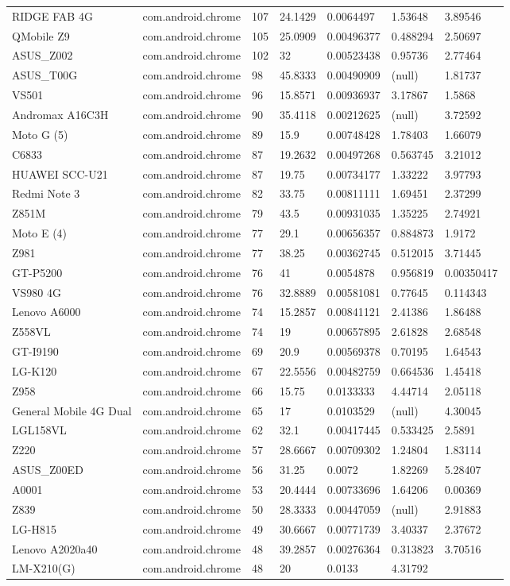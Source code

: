 \documentclass[
]{article}
\begin{document}
\begin{longtable}[]{@{}lllllll@{}}
RIDGE FAB 4G & com.android.chrome & 107 & 24.1429 & 0.0064497 & 1.53648
& 3.89546\tabularnewline
QMobile Z9 & com.android.chrome & 105 & 25.0909 & 0.00496377 & 0.488294
& 2.50697\tabularnewline
ASUS\_Z002 & com.android.chrome & 102 & 32 & 0.00523438 & 0.95736 &
2.77464\tabularnewline
ASUS\_T00G & com.android.chrome & 98 & 45.8333 & 0.00490909 & (null) &
1.81737\tabularnewline
VS501 & com.android.chrome & 96 & 15.8571 & 0.00936937 & 3.17867 &
1.5868\tabularnewline
Andromax A16C3H & com.android.chrome & 90 & 35.4118 & 0.00212625 &
(null) & 3.72592\tabularnewline
Moto G (5) & com.android.chrome & 89 & 15.9 & 0.00748428 & 1.78403 &
1.66079\tabularnewline
C6833 & com.android.chrome & 87 & 19.2632 & 0.00497268 & 0.563745 &
3.21012\tabularnewline
HUAWEI SCC-U21 & com.android.chrome & 87 & 19.75 & 0.00734177 & 1.33222
& 3.97793\tabularnewline
Redmi Note 3 & com.android.chrome & 82 & 33.75 & 0.00811111 & 1.69451 &
2.37299\tabularnewline
Z851M & com.android.chrome & 79 & 43.5 & 0.00931035 & 1.35225 &
2.74921\tabularnewline
Moto E (4) & com.android.chrome & 77 & 29.1 & 0.00656357 & 0.884873 &
1.9172\tabularnewline
Z981 & com.android.chrome & 77 & 38.25 & 0.00362745 & 0.512015 &
3.71445\tabularnewline
GT-P5200 & com.android.chrome & 76 & 41 & 0.0054878 & 0.956819 &
0.00350417\tabularnewline
VS980 4G & com.android.chrome & 76 & 32.8889 & 0.00581081 & 0.77645 &
0.114343\tabularnewline
Lenovo A6000 & com.android.chrome & 74 & 15.2857 & 0.00841121 & 2.41386
& 1.86488\tabularnewline
Z558VL & com.android.chrome & 74 & 19 & 0.00657895 & 2.61828 &
2.68548\tabularnewline
GT-I9190 & com.android.chrome & 69 & 20.9 & 0.00569378 & 0.70195 &
1.64543\tabularnewline
LG-K120 & com.android.chrome & 67 & 22.5556 & 0.00482759 & 0.664536 &
1.45418\tabularnewline
Z958 & com.android.chrome & 66 & 15.75 & 0.0133333 & 4.44714 &
2.05118\tabularnewline
General Mobile 4G Dual & com.android.chrome & 65 & 17 & 0.0103529 &
(null) & 4.30045\tabularnewline
LGL158VL & com.android.chrome & 62 & 32.1 & 0.00417445 & 0.533425 &
2.5891\tabularnewline
Z220 & com.android.chrome & 57 & 28.6667 & 0.00709302 & 1.24804 &
1.83114\tabularnewline
ASUS\_Z00ED & com.android.chrome & 56 & 31.25 & 0.0072 & 1.82269 &
5.28407\tabularnewline
A0001 & com.android.chrome & 53 & 20.4444 & 0.00733696 & 1.64206 &
0.00369\tabularnewline
Z839 & com.android.chrome & 50 & 28.3333 & 0.00447059 & (null) &
2.91883\tabularnewline
LG-H815 & com.android.chrome & 49 & 30.6667 & 0.00771739 & 3.40337 &
2.37672\tabularnewline
Lenovo A2020a40 & com.android.chrome & 48 & 39.2857 & 0.00276364 &
0.313823 & 3.70516\tabularnewline
LM-X210(G) & com.android.chrome & 48 & 20 & 0.0133 & 4.31792 &

\end{longtable}
\end{document}
